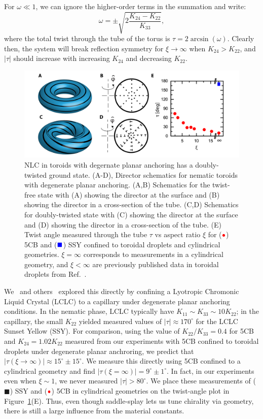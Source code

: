 For $\omega \ll 1$, we can ignore the higher-order terms in the summation and write:
\begin{equation}
  \omega = \pm \sqrt{2\frac{K_{24}-K_{22}}{K_{33}}},
\end{equation}
where the total twist through the tube of the torus is $\tau = 2 \arcsin (\omega)$.
Clearly then, the system will break reflection symmetry for $\xi \rightarrow \infty$ when $K_{24}> K_{22}$, and $|\tau|$ should increase with increasing $K_{24}$ and decreasing $K_{22}$.
\begin{figure}
  \centering
  \includegraphics{figures/C4/Ch4-Figs_PlanarTwist.png}
  \caption{NLC in toroids with degernate planar anchoring has a doubly-twisted ground state.
  (A-D), Director schematics for nematic toroids with degenerate planar anchoring.
  (A,B) Schematics for the twist-free state with (A) showing the director at the surface and (B) showing the director in a cross-section of the tube.
  (C,D) Schematics for doubly-twisted state with (C) showing the director at the surface and (D) showing the director in a cross-section of the tube.
  (E) Twist angle measured through the tube $\tau$ vs aspect ratio $\xi$ for (${\color{red} \bullet}$) 5CB and (${\color{blue} \blacksquare}$) SSY confined to toroidal droplets and cylindrical geometries.
  $\xi = \infty$ corresponds to measurements in a cylindrical geometry, and $\xi < \infty$ are previously published data in toroidal droplets from Ref.~\cite{RN46}.}\label{f:4-PlanarToroidsTwist}
\end{figure}

We~\cite{RN293} and others~\cite{RN191} explored this directly by confining a Lyotropic Chromonic Liquid Crystal (LCLC) to a capillary under degenerate planar anchoring conditions.
In the nematic phase, LCLC typically have $K_{11} \sim K_{33} \sim 10 K_{22}$; in the capillary, the small $K_{22}$ yielded measured values of $|\tau| \approx 170 ^{\circ}$ for the LCLC Sunset Yellow (SSY).
For comparison, using the value of $K_{22}/K_{33}=0.4$ for 5CB and $K_{24} = 1.02 K_{22}$ measured from our experiments with 5CB confined to toroidal droplets under degenerate planar anchroring, we predict that $|\tau (\xi \rightarrow \infty)| \approx 15^{\circ} \pm 15^{\circ}$.
We measure this directly using 5CB confined to a cylindrical geometry and find $|\tau (\xi = \infty)| = 9^{\circ} \pm 1^{\circ}$.
In fact, in our experiments even when $\xi \sim 1$, we never measured $|\tau| > 80^{\circ}$.
We place these measurements of (${\blacksquare}$) SSY and (${\color{red} \bullet}$) 5CB in cylindrical geometries on the twist-angle plot in Figure~\ref{f:4-PlanarToroidsTwist}(E).
Thus, even though saddle-splay lets us tune chirality via geometry, there is still a large influence from the material constants.

